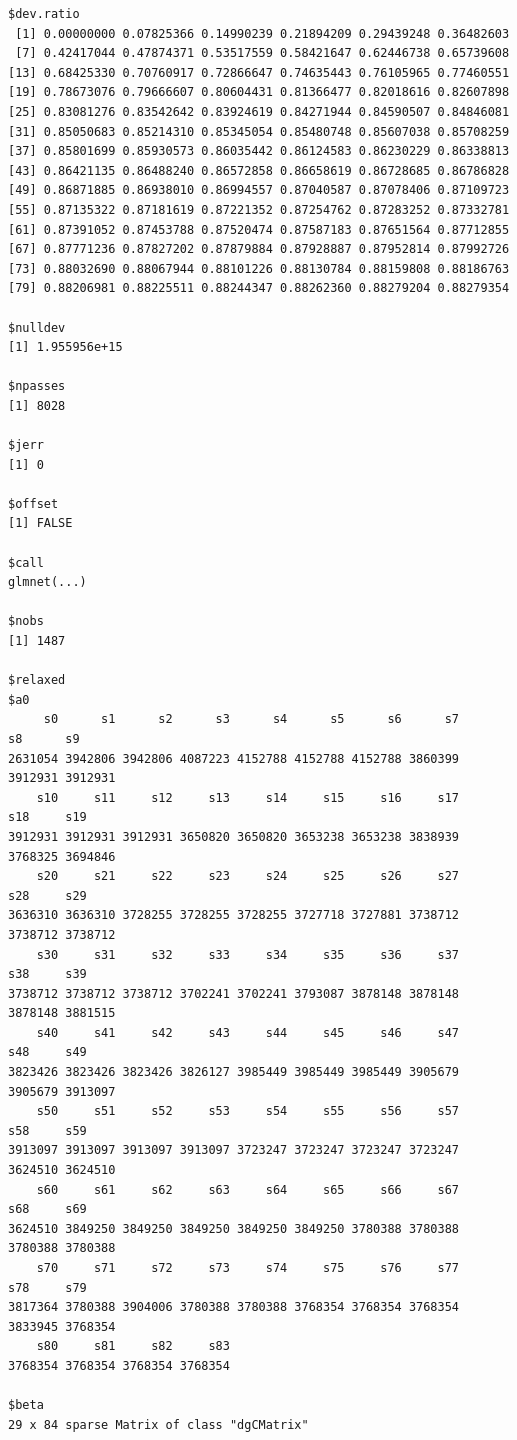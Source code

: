 \documentclass[
]{article}
\begin{document}
\begin{verbatim}
$dev.ratio
 [1] 0.00000000 0.07825366 0.14990239 0.21894209 0.29439248 0.36482603
 [7] 0.42417044 0.47874371 0.53517559 0.58421647 0.62446738 0.65739608
[13] 0.68425330 0.70760917 0.72866647 0.74635443 0.76105965 0.77460551
[19] 0.78673076 0.79666607 0.80604431 0.81366477 0.82018616 0.82607898
[25] 0.83081276 0.83542642 0.83924619 0.84271944 0.84590507 0.84846081
[31] 0.85050683 0.85214310 0.85345054 0.85480748 0.85607038 0.85708259
[37] 0.85801699 0.85930573 0.86035442 0.86124583 0.86230229 0.86338813
[43] 0.86421135 0.86488240 0.86572858 0.86658619 0.86728685 0.86786828
[49] 0.86871885 0.86938010 0.86994557 0.87040587 0.87078406 0.87109723
[55] 0.87135322 0.87181619 0.87221352 0.87254762 0.87283252 0.87332781
[61] 0.87391052 0.87453788 0.87520474 0.87587183 0.87651564 0.87712855
[67] 0.87771236 0.87827202 0.87879884 0.87928887 0.87952814 0.87992726
[73] 0.88032690 0.88067944 0.88101226 0.88130784 0.88159808 0.88186763
[79] 0.88206981 0.88225511 0.88244347 0.88262360 0.88279204 0.88279354

$nulldev
[1] 1.955956e+15

$npasses
[1] 8028

$jerr
[1] 0

$offset
[1] FALSE

$call
glmnet(...)

$nobs
[1] 1487

$relaxed
$a0
     s0      s1      s2      s3      s4      s5      s6      s7      s8      s9 
2631054 3942806 3942806 4087223 4152788 4152788 4152788 3860399 3912931 3912931 
    s10     s11     s12     s13     s14     s15     s16     s17     s18     s19 
3912931 3912931 3912931 3650820 3650820 3653238 3653238 3838939 3768325 3694846 
    s20     s21     s22     s23     s24     s25     s26     s27     s28     s29 
3636310 3636310 3728255 3728255 3728255 3727718 3727881 3738712 3738712 3738712 
    s30     s31     s32     s33     s34     s35     s36     s37     s38     s39 
3738712 3738712 3738712 3702241 3702241 3793087 3878148 3878148 3878148 3881515 
    s40     s41     s42     s43     s44     s45     s46     s47     s48     s49 
3823426 3823426 3823426 3826127 3985449 3985449 3985449 3905679 3905679 3913097 
    s50     s51     s52     s53     s54     s55     s56     s57     s58     s59 
3913097 3913097 3913097 3913097 3723247 3723247 3723247 3723247 3624510 3624510 
    s60     s61     s62     s63     s64     s65     s66     s67     s68     s69 
3624510 3849250 3849250 3849250 3849250 3849250 3780388 3780388 3780388 3780388 
    s70     s71     s72     s73     s74     s75     s76     s77     s78     s79 
3817364 3780388 3904006 3780388 3780388 3768354 3768354 3768354 3833945 3768354 
    s80     s81     s82     s83 
3768354 3768354 3768354 3768354 

$beta
29 x 84 sparse Matrix of class "dgCMatrix"
\end{verbatim}
\end{document}
